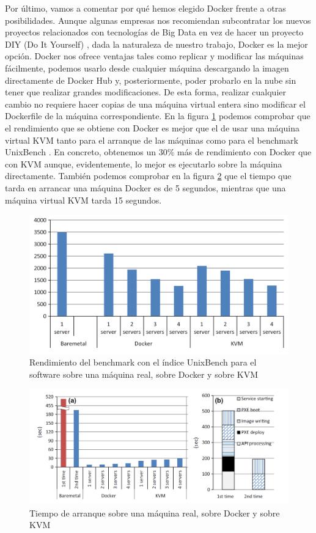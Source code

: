 Por último, vamos a comentar por qué hemos elegido Docker frente a otras posibilidades. Aunque algunas empresas nos recomiendan subcontratar los nuevos proyectos relacionados con tecnologías de Big Data en vez de hacer un proyecto DIY (Do It Yourself) \cite{Dck-14}, dada la naturaleza de nuestro trabajo, Docker es la mejor opción. Docker nos ofrece ventajas tales como replicar y modificar las máquinas fácilmente, podemos usarlo desde cualquier máquina descargando la imagen directamente de Docker Hub y, posteriormente, poder probarlo en la nube sin tener que realizar grandes modificaciones. De esta forma, realizar cualquier cambio no requiere hacer copias de una máquina virtual entera sino modificar el Dockerfile de la máquina correspondiente. En la figura \ref{dock-2} \cite{Dck-15} podemos comprobar que el rendimiento que se obtiene con Docker es mejor que el de usar una máquina virtual KVM tanto para el arranque de las máquinas como para el benchmark UnixBench \cite{Dck-15}. En concreto, obtenemos un 30\% más de rendimiento con Docker que con KVM aunque, evidentemente, lo mejor es ejecutarlo sobre la máquina directamente. También podemos comprobar en la figura \ref{dock-3}  \cite{Dck-15} que el tiempo que tarda en arrancar una máquina Docker es de 5 segundos, mientras que una máquina virtual KVM tarda 15 segundos.\par

\begin{figure}[htp]
\centering
\includegraphics[scale=0.40]{Imagenes/dockervsvm2.png}
\caption{Rendimiento del benchmark con el índice UnixBench para el software sobre una máquina real, sobre Docker y sobre KVM}
\label{dock-2}
\end{figure}

\begin{figure}[htp]
\centering
\includegraphics[scale=0.40]{Imagenes/dockervsvm3.png}
\caption{Tiempo de arranque sobre una máquina real, sobre Docker y sobre KVM}
\label{dock-3}
\end{figure}


